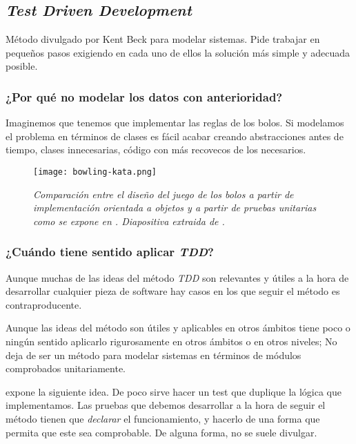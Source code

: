 \subsection{\textit{Test Driven Development}}

Método divulgado por Kent Beck \cite{TDD} para modelar sistemas.
Pide trabajar en pequeños pasos exigiendo en cada uno de ellos
la solución más simple y adecuada posible.

\subsubsection{¿Por qué no modelar los datos con anterioridad?}

Imaginemos que tenemos que implementar las reglas de los bolos.
Si modelamos el problema en términos de clases es fácil acabar 
creando abstracciones antes de tiempo, clases innecesarias,
código con más recovecos de los necesarios.

\begin{figure}[!h]
    \centering
    \texttt{[image: bowling-kata.png]}
    \caption{\textit{Comparación entre el diseño del juego de
    los bolos a partir de implementación orientada a objetos
    y a partir de pruebas unitarias como se expone en \cite{TDD}.
    Diapositiva extraida de \cite{BowlingKata}.}}
\end{figure}

\subsubsection{¿Cuándo tiene sentido aplicar \textit{TDD}?}

Aunque muchas de las ideas del método \textit{TDD} son relevantes
y útiles a la hora de desarrollar cualquier pieza de software hay casos
en los que seguir el método es contraproducente.

Aunque las ideas del método son útiles y aplicables en otros ámbitos
tiene poco o ningún sentido aplicarlo rigurosamente en otros ámbitos o
en otros niveles; No deja de ser un método para modelar sistemas en
términos de módulos comprobados unitariamente.

\cite{TDD} expone la siguiente idea.
De poco sirve hacer un test que duplique la lógica que implementamos. Las
pruebas que debemos desarrollar a la hora de seguir el método tienen que
\textit{declarar} el funcionamiento, y hacerlo de una forma que permita que
este sea comprobable. De alguna forma, no se suele divulgar.


